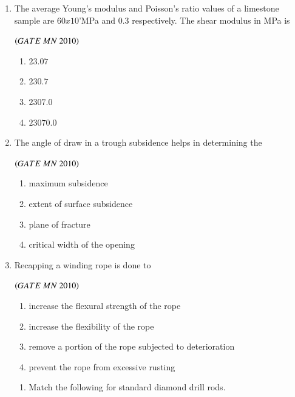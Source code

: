 \documentclass{article}
\begin{document}
\begin{enumerate}[label=Q.\arabic*., itemsep=1em, leftmargin=0pt, itemindent=*, labelsep=0.5em]
 \item The average Young's modulus and Poisson's ratio values of a limestone sample are $60 x 10$'MPa
and $0.3$ respectively. The shear modulus in MPa is
\\
\begin{flushright}
\hfill$\left(GATE\ MN\ 2010\right)$
\end{flushright}
\begin{multicols}{4}
\begin{enumerate}[label=(\Alph*),leftmargin=4em]
\item $23.07$
\item $230.7$
\item $2307.0$
\item $23070.0$
\end{enumerate}
\end{multicols}
\bigskip
\item The angle of draw in a trough subsidence helps in determining the
\begin{flushright}
\hfill$\left(GATE\ MN\ 2010\right)$
\end{flushright}
\begin{enumerate}[label=(\Alph*),leftmargin=4em]
\item maximum subsidence
\item extent of surface subsidence
\item plane of fracture
\item critical width of the opening
\end{enumerate}
\bigskip
\item Recapping a winding rope is done to
\begin{flushright}
\hfill$\left(GATE\ MN\ 2010\right)$
\end{flushright}
\begin{enumerate}[label=(\Alph*),leftmargin=4em]
\item increase the flexural strength of the rope
\item increase the flexibility of the rope
\item remove a portion of the rope subjected to deterioration
\item  prevent the rope from excessive rusting
\bigskip
\end{enumerate}
\begin{enumerate}[label=Q.\arabic*., start=17, leftmargin=2em]

\item Match the following for standard diamond drill rods.


\end{enumerate}
\end{enumerate}
\end{document}
